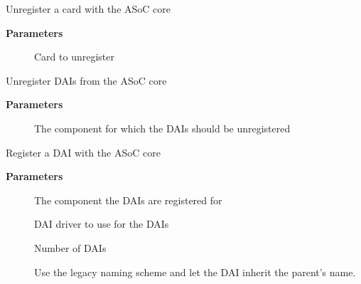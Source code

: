 \documentclass[a4paper,8pt,english]{sphinxmanual}
\begin{document}
\begin{fulllineitems}
\label{sound/kernel-api/alsa-driver-api:c.snd_soc_unregister_card}
Unregister a card with the ASoC core

\end{fulllineitems}


\textbf{Parameters}
\begin{description}
\item[{}] \leavevmode
Card to unregister

\end{description}

\begin{fulllineitems}
\label{sound/kernel-api/alsa-driver-api:c.snd_soc_unregister_dais}
Unregister DAIs from the ASoC core

\end{fulllineitems}


\textbf{Parameters}
\begin{description}
\item[{}] \leavevmode
The component for which the DAIs should be unregistered

\end{description}

\begin{fulllineitems}
\label{sound/kernel-api/alsa-driver-api:c.snd_soc_register_dais}
Register a DAI with the ASoC core

\end{fulllineitems}


\textbf{Parameters}
\begin{description}
\item[{}] \leavevmode
The component the DAIs are registered for

\item[{}] \leavevmode
DAI driver to use for the DAIs

\item[{}] \leavevmode
Number of DAIs

\item[{}] \leavevmode
Use the legacy naming scheme and let the DAI inherit the
parent's name.

\end{description}
\end{document}
